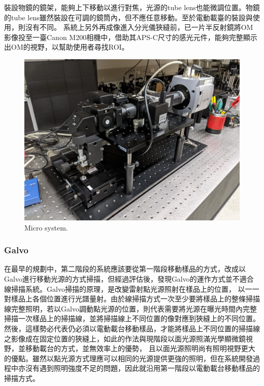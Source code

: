 \documentclass[12pt]{article}
\begin{document}
裝設物鏡的鏡架，能夠上下移動以進行對焦，光源的tube lens也能微調位置。物鏡的tube lens雖然裝設在可調的鏡筒內，但不應任意移動。至於電動載臺的裝設與使用，則沒有不同。
系統上另外再成像進入分光儀狹縫前，已一片半反射鏡將OM影像投至一臺Canon M200相機中，借助其APS-C尺寸的感光元件，能夠完整顯示出OM的視野，以幫助使用者尋找ROI。
\begin{figure}
    \centering
    \includegraphics[width=\linewidth]{microSystemPixel3.jpg}
    \caption{Micro system.}
\end{figure}

\subsubsection{Galvo}
在最早的規劃中，第二階段的系統應該要從第一階段移動樣品的方式，改成以Galvo進行移動光源的方式掃描，但經過評估後，發現Galvo的運作方式並不適合線掃描系統。Galvo掃描的原理，是改變雷射點光源照射在樣品上的位置，
以一一對樣品上各個位置進行光譜量射。由於線掃描方式一次至少要將樣品上的整條掃描線完整照明，若以Galvo調動點光源的位置，則代表需要將光源在曝光時間內完整掃描一次樣品上的掃描線，並將掃描線上不同位置的像對應到狹縫上的不同位置。
然後，這樣勢必代表仍必須以電動載台移動樣品，才能將樣品上不同位置的掃描線之影像成在固定位置的狹縫上，如此的作法與現階段以面光源照滿光學顯微鏡視野，並移動載台的方式，並無效率上的優勢，
且以面光源照明尚有照明視野更大的優點。雖然以點光源方式理應可以相同的光源提供更強的照明，但在系統開發過程中亦沒有遇到照明強度不足的問題，因此就沿用第一階段以電動載台移動樣品的掃描方式。
\end{document}
